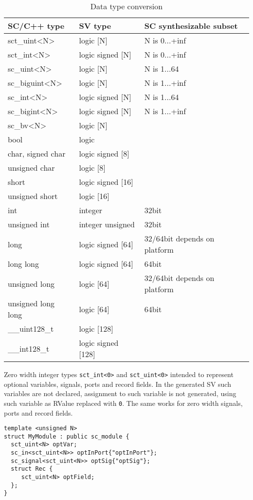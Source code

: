 \begin{table}
\begin{tabular}{|l|l|l|}
\hline
SC/C++ type & SV type  & SC synthesizable subset \\
\hline
sct\_uint<N> & logic [N] & N is 0...+inf \\
sct\_int<N> & logic signed [N] & N is 0...+inf \\
sc\_uint<N> & logic [N] & N is 1...64 \\
sc\_biguint<N> & logic [N] & N is 1...+inf \\
sc\_int<N> & logic signed [N] & N is 1...64 \\
sc\_bigint<N> & logic signed [N] & N is 1...+inf \\
sc\_bv<N> & logic [N] & \\
bool & logic & \\
char, signed char & logic signed [8] & \\
unsigned char & logic [8] & \\
short & logic signed [16] & \\
unsigned short & logic [16] & \\
int & integer & 32bit \\
unsigned int & integer unsigned & 32bit \\
long & logic signed [64] & 32/64bit depends on platform \\
long long & logic signed [64] & 64bit \\
unsigned long & logic [64] & 32/64bit depends on platform \\
unsigned long long & logic [64] & 64bit \\
\_\_uint128\_t & logic [128] & \\
\_\_int128\_t & logic signed [128] & \\
\hline
\end{tabular}
\caption{Data type conversion}
\label{tab:data_types}
\end{table}

Zero width integer types {\tt sct\_int<0>} and {\tt sct\_uint<0>} intended to represent optional variables, signals, ports and record fields. In the generated SV such variables are not declared, assignment to such variable is not generated, using such variable as RValue replaced with {\tt 0}. The same works for zero width signals, ports and record fields.

\begin{lstlisting}[style=mycpp]
template <unsigned N>
struct MyModule : public sc_module {
  sct_uint<N> optVar;
  sc_in<sct_uint<N>> optInPort{"optInPort"};
  sc_signal<sct_uint<N>> optSig{"optSig"};
  struct Rec {
     sct_uint<N> optField;     
  };
}
\end{lstlisting}

